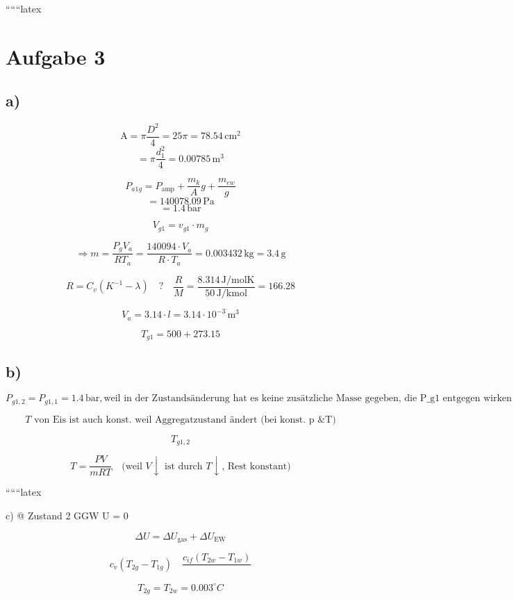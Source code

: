 
``````latex


\section*{Aufgabe 3}

\subsection*{a)}

\[
\text{A} = \pi \frac{D^2}{4} = 25\pi = 78.54 \, \text{cm}^2
\]
\[
= \pi \frac{d_1^2}{4} = 0.00785 \, \text{m}^3
\]

\[
P_{a1g} = P_{\text{amp}} + \frac{m_k}{A} g + \frac{m_{ew}}{g}
\]
\[
= 140078.09 \, \text{Pa}
\]
\[
= 1.4 \, \text{bar}
\]

\[
V_{g1} = v_{g1} \cdot m_g
\]

\[
\Rightarrow m = \frac{P_g V_a}{R T_a} = \frac{140094 \cdot V_a}{R \cdot T_a} = 0.003432 \, \text{kg} = 3.4 \, \text{g}
\]

\[
R = C_v (K^{-1} - \lambda) \quad \text{?} \quad \frac{R}{M} = \frac{8.314 \, \text{J/molK}}{50 \, \text{J/kmol}} = 166.28
\]

\[
V_a = 3.14 \cdot l = 3.14 \cdot 10^{-3} \, \text{m}^3
\]

\[
T_{g1} = 500 + 273.15
\]

\subsection*{b)}

\[
P_{g1,2} = P_{g1,1} = 1.4 \, \text{bar}, \text{weil in der Zustandsänderung hat es keine zusätzliche Masse gegeben, die P_{g1} entgegen wirken muss (da EW konstante Masse \& Volumen auch)}
\]

\[
T \text{ von Eis ist auch konst. weil Aggregatzustand ändert (bei konst. p \& T)}
\]

\[
T_{g1,2}
\]

\[
T = \frac{PV}{mRT} \quad \text{(weil } V \downarrow \text{ ist durch } T \downarrow \text{, Rest konstant)}
\]

``````latex


c) @ Zustand 2 GGW \quad \longrightarrow \quad \Delta U = 0

\[
\Delta U = \Delta U_{\text{gas}} + \Delta U_{\text{EW}}
\]

\[
c_v \left( T_{2g} - T_{1g} \right) \quad \frac{c_{if} \left( T_{2w} - T_{1w} \right)}{}
\]

\[
T_{2g} = T_{2w} = 0.003^\circ C
\]

